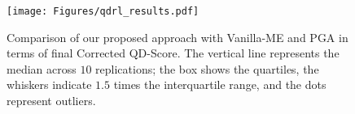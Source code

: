 \begin{figure}[t!]
  \centering
  \texttt{[image: Figures/qdrl\_results.pdf]}
  \caption{
    Comparison of our proposed \namepga{}{} approach with Vanilla-ME and PGA in terms of final Corrected QD-Score. The vertical line represents the median across $10$ replications; the box shows the quartiles, the whiskers indicate $1.5$ times the interquartile range, and the dots represent outliers. 
  }
  \label{fig:qdrl_results}
  \vspace{-4mm}
\end{figure}
